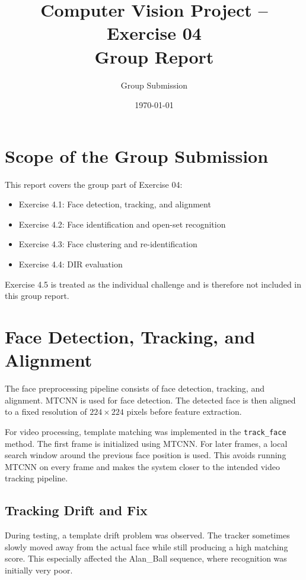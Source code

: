 \documentclass[11pt,a4paper]{article}
\title{\textbf{Computer Vision Project -- Exercise 04}\\Group Report}
\author{Group Submission}
\date{\today}
\begin{document}
\maketitle

\section{Scope of the Group Submission}

This report covers the group part of Exercise 04:

\begin{itemize}[noitemsep]
    \item Exercise 4.1: Face detection, tracking, and alignment
    \item Exercise 4.2: Face identification and open-set recognition
    \item Exercise 4.3: Face clustering and re-identification
    \item Exercise 4.4: DIR evaluation
\end{itemize}

Exercise 4.5 is treated as the individual challenge and is therefore not included in this group report.

\section{Face Detection, Tracking, and Alignment}

The face preprocessing pipeline consists of face detection, tracking, and alignment. MTCNN is used for face detection. The detected face is then aligned to a fixed resolution of $224 \times 224$ pixels before feature extraction.

For video processing, template matching was implemented in the \texttt{track\_face} method. The first frame is initialized using MTCNN. For later frames, a local search window around the previous face position is used. This avoids running MTCNN on every frame and makes the system closer to the intended video tracking pipeline.

\subsection{Tracking Drift and Fix}

During testing, a template drift problem was observed. The tracker sometimes slowly moved away from the actual face while still producing a high matching score. This especially affected the Alan\_Ball sequence, where recognition was initially very poor.
\end{document}
